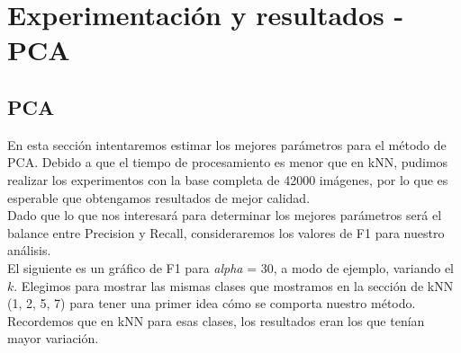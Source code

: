 
\section{Experimentación y resultados - PCA}

\subsection{PCA}

En esta sección intentaremos estimar los mejores parámetros para el método de PCA. Debido a que el tiempo de procesamiento es menor que en kNN, pudimos realizar los experimentos con la base completa de 42000 imágenes, por lo que es esperable que obtengamos resultados de mejor calidad. \\

Dado que lo que nos interesará para determinar los mejores parámetros será el balance entre Precision y Recall, consideraremos los valores de F1 para nuestro análisis.  \\

El siguiente es un gráfico de F1 para \textit{alpha} = 30, a modo de ejemplo, variando el $k$. Elegimos para mostrar las mismas clases que mostramos en la sección de kNN (1, 2, 5, 7) para tener una primer idea cómo se comporta nuestro método. Recordemos que en kNN para esas clases, los resultados eran los que tenían mayor variación. \\




$ $\newline

